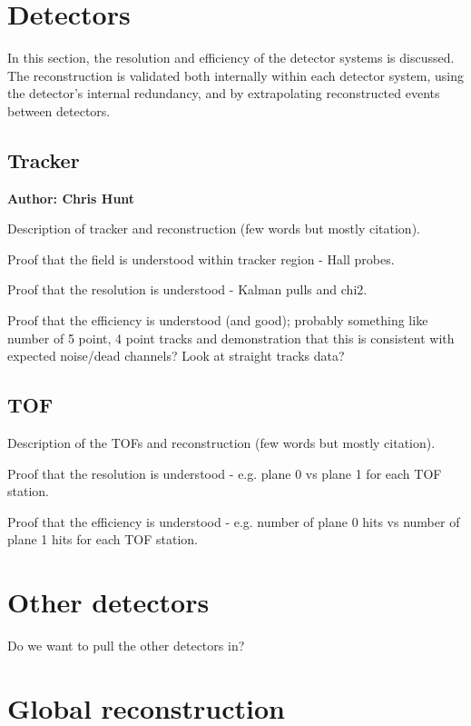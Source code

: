 \section{Detectors}
\label{Sect:Detectors}

In this section, the resolution and efficiency of the detector systems is
discussed. The reconstruction is validated both internally within each
detector system, using the detector's internal redundancy, and by extrapolating
reconstructed events between detectors.

\subsection{Tracker}

\textbf{Author: Chris Hunt}

Description of tracker and reconstruction (few words but mostly citation).

Proof that the field is understood within tracker region - Hall probes.

Proof that the resolution is understood - Kalman pulls and chi2. 

Proof that the efficiency is understood (and good); probably something like 
number of 5 point, 4 point tracks and demonstration that this is consistent with
expected noise/dead channels? Look at straight tracks data?

\subsection{TOF}

Description of the TOFs and reconstruction (few words but mostly citation).

Proof that the resolution is understood - e.g. plane 0 vs plane 1 for each TOF station.

Proof that the efficiency is understood - e.g. number of plane 0 hits vs number 
of plane 1 hits for each TOF station.

\section{Other detectors}

Do we want to pull the other detectors in?


\section{Global reconstruction}


